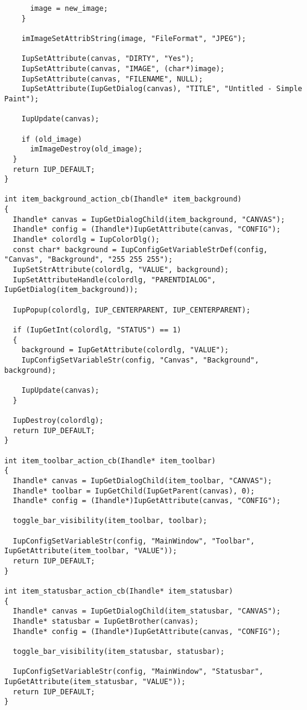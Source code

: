 \documentclass{ctexart}
\begin{document}
\begin{lstlisting}
      image = new_image;
    }

    imImageSetAttribString(image, "FileFormat", "JPEG");

    IupSetAttribute(canvas, "DIRTY", "Yes");
    IupSetAttribute(canvas, "IMAGE", (char*)image);
    IupSetAttribute(canvas, "FILENAME", NULL);
    IupSetAttribute(IupGetDialog(canvas), "TITLE", "Untitled - Simple Paint");

    IupUpdate(canvas);

    if (old_image)
      imImageDestroy(old_image);
  }
  return IUP_DEFAULT;
}

int item_background_action_cb(Ihandle* item_background)
{
  Ihandle* canvas = IupGetDialogChild(item_background, "CANVAS");
  Ihandle* config = (Ihandle*)IupGetAttribute(canvas, "CONFIG");
  Ihandle* colordlg = IupColorDlg();
  const char* background = IupConfigGetVariableStrDef(config, "Canvas", "Background", "255 255 255");
  IupSetStrAttribute(colordlg, "VALUE", background);
  IupSetAttributeHandle(colordlg, "PARENTDIALOG", IupGetDialog(item_background));

  IupPopup(colordlg, IUP_CENTERPARENT, IUP_CENTERPARENT);

  if (IupGetInt(colordlg, "STATUS") == 1)
  {
    background = IupGetAttribute(colordlg, "VALUE");
    IupConfigSetVariableStr(config, "Canvas", "Background", background);

    IupUpdate(canvas);
  }

  IupDestroy(colordlg);
  return IUP_DEFAULT;
}

int item_toolbar_action_cb(Ihandle* item_toolbar)
{
  Ihandle* canvas = IupGetDialogChild(item_toolbar, "CANVAS");
  Ihandle* toolbar = IupGetChild(IupGetParent(canvas), 0);
  Ihandle* config = (Ihandle*)IupGetAttribute(canvas, "CONFIG");

  toggle_bar_visibility(item_toolbar, toolbar);

  IupConfigSetVariableStr(config, "MainWindow", "Toolbar", IupGetAttribute(item_toolbar, "VALUE"));
  return IUP_DEFAULT;
}

int item_statusbar_action_cb(Ihandle* item_statusbar)
{
  Ihandle* canvas = IupGetDialogChild(item_statusbar, "CANVAS");
  Ihandle* statusbar = IupGetBrother(canvas);
  Ihandle* config = (Ihandle*)IupGetAttribute(canvas, "CONFIG");

  toggle_bar_visibility(item_statusbar, statusbar);

  IupConfigSetVariableStr(config, "MainWindow", "Statusbar", IupGetAttribute(item_statusbar, "VALUE"));
  return IUP_DEFAULT;
}


\end{lstlisting}
\end{document}
